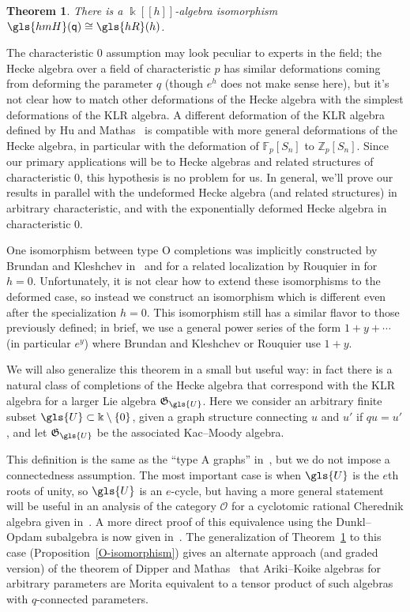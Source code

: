 \documentclass[10pt]{article}
\newtheorem{theorem}{Theorem}[section]
\theoremstyle{definition}
\newcommand{\pq}{\mathsf{q}}
\newcommand{\K}{\Bbbk}%
\newcommand{\cO}{\mathcal{O}}
\newcommand{\hmH}{\gls{hmH}}
\newcommand{\hR}{\gls{hR}}
\newcommand\llbracket{[\![}
\newcommand\rrbracket{]\!]}
\begin{document}
\begin{theorem} \label{thm:O-main}
 There is a $\K\llbracket h\rrbracket $-algebra isomorphism $\hmH(\pq)\cong \hR(h)$. 
\end{theorem}
The characteristic 0 assumption may look peculiar to experts in the
field; the Hecke algebra over a field of characteristic $p$ has
similar deformations coming from deforming the parameter $q$ (though
$e^h$ does not make sense here), but it's not clear how to match other
deformations of the Hecke algebra with the simplest deformations of
the KLR algebra. 
A different deformation of the KLR algebra defined by Hu and Mathas~\cite{HMsemi} is
compatible with more general deformations of the Hecke algebra, in particular with the
deformation of $\mathbb{F}_p[S_n]$ to $\mathbb{Z}_p[S_n]$. 
Since our primary applications will be to Hecke algebras and
related structures of characteristic 0, this hypothesis is no problem
for us. In general, we'll prove our results in parallel with the undeformed Hecke
algebra (and related structures) in arbitrary characteristic, and with
the exponentially deformed Hecke algebra in characteristic 0.

One isomorphism between type O completions was implicitly constructed by Brundan and
Kleshchev in~\cite{BKKL} and for a related localization by Rouquier in
\cite[\S~3.2.5]{Rou2KM} for $h=0$. Unfortunately, it is not clear how
to extend these isomorphisms to the deformed case, so instead we
construct an isomorphism which is different even after the
specialization $h=0$. This isomorphism still has a similar flavor to those previously
defined; in brief, we use a general power series of the form
$1+y+\cdots$ (in particular $e^y$) where Brundan and Kleshchev or
Rouquier use $1+y$. 

We will also generalize this theorem in a small
but useful way: in fact there is a natural class of completions of the Hecke
algebra that correspond with the KLR algebra for a larger Lie
algebra $\mathfrak{G}_{\gls{U}}$. Here we consider an arbitrary finite subset $\gls{U}\subset \K\setminus\{0\}$, given a graph
structure connecting $u$ and $u'$ if $qu=u'$, and let $\mathfrak{G}_{\gls{U}}$
be the associated Kac--Moody algebra. 

This definition is the same as
the ``type A graphs'' in~\cite[\S~3.2.5]{Rou2KM}, but we do not impose
a connectedness assumption. 
The most important case is when $\gls{U}$ is the $e$th roots of unity, so
$\gls{U}$ is an $e$-cycle, but having a more general statement will be
useful in an analysis of the category $\cO$ for a cyclotomic rational
Cherednik algebra given in~\cite{WebRou}. A more direct proof of this
equivalence using the Dunkl--Opdam subalgebra is now given in~\cite{Webalt}. The generalization of
Theorem~\ref{thm:O-main} to this case (Proposition~\ref{O-isomorphism}) gives an
alternate approach (and graded version) of the theorem of Dipper and
Mathas~\cite{DMmorita} that Ariki--Koike algebras for arbitrary parameters are Morita
equivalent to a tensor product of such algebras with $q$-connected parameters.
\end{document}
